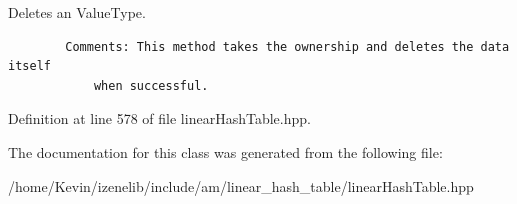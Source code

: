 Deletes an ValueType. 



\begin{Code}\begin{verbatim}        Comments: This method takes the ownership and deletes the data itself
            when successful.
\end{verbatim}
\end{Code}

 

Definition at line 578 of file linearHashTable.hpp.

The documentation for this class was generated from the following file:\begin{CompactItemize}
\item 
/home/Kevin/izenelib/include/am/linear\_\-hash\_\-table/linearHashTable.hpp\end{CompactItemize}
